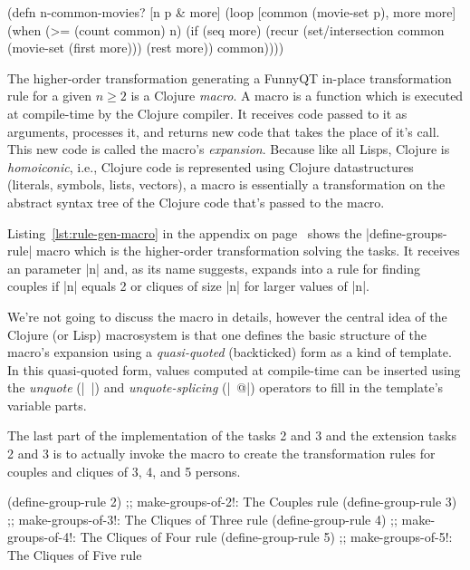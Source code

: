 \documentclass[submission]{eptcs}
\newcommand{\code}{\clojureinline}
\begin{document}
\begin{clojurecode}
(defn n-common-movies? [n p & more]
  (loop [common (movie-set p), more more]
    (when (>= (count common) n)
      (if (seq more)
        (recur (set/intersection common (movie-set (first more))) (rest more))
        common))))
\end{clojurecode}

The higher-order transformation generating a FunnyQT in-place transformation
rule for a given \(n \geq 2\)
is a Clojure \emph{macro}.  A macro is a function which is executed at
compile-time by the Clojure compiler.  It receives code passed to it as
arguments, processes it, and returns new code that takes the place of it's
call.  This new code is called the macro's \emph{expansion}.  Because like all
Lisps, Clojure is \emph{homoiconic}, i.e., Clojure code is represented using
Clojure datastructures (literals, symbols, lists, vectors), a macro is
essentially a transformation on the abstract syntax tree of the Clojure code
that's passed to the macro.

Listing~\ref{lst:rule-gen-macro} in the appendix on
page~\pageref{lst:rule-gen-macro} shows the \code|define-groups-rule| macro
which is the higher-order transformation solving the tasks.  It receives an
parameter \code|n| and, as its name suggests, expands into a rule for finding
couples if \code|n| equals 2 or cliques of size \code|n| for larger values of
\code|n|.

We're not going to discuss the macro in details, however the central idea of
the Clojure (or Lisp) macrosystem is that one defines the basic structure of
the macro's expansion using a \emph{quasi-quoted} (backticked) form as a kind
of template.  In this quasi-quoted form, values computed at compile-time can be
inserted using the \emph{unquote} (\code|~|) and \emph{unquote-splicing}
(\code|~@|) operators to fill in the template's variable parts.

The last part of the implementation of the tasks 2 and 3 and the extension
tasks 2 and 3 is to actually invoke the macro to create the transformation
rules for couples and cliques of 3, 4, and 5 persons.

\begin{clojurecode}
(define-group-rule 2) ;; make-groups-of-2!: The Couples rule
(define-group-rule 3) ;; make-groups-of-3!: The Cliques of Three rule
(define-group-rule 4) ;; make-groups-of-4!: The Cliques of Four rule
(define-group-rule 5) ;; make-groups-of-5!: The Cliques of Five rule
\end{clojurecode}
\end{document}
